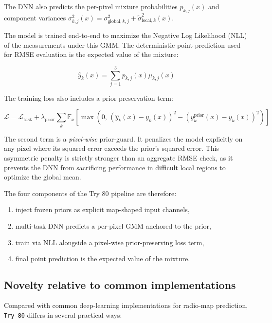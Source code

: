 \documentclass[11pt,a4paper]{article}
\begin{document}
The DNN also predicts the per-pixel mixture probabilities $p_{k,j}(x)$ and
component variances $\sigma_{k,j}^2(x) = \sigma_{\mathrm{global},k,j}^2 +
\tilde\sigma_{\mathrm{local},k}^2(x)$.

The model is trained end-to-end to maximize the Negative Log Likelihood (NLL)
of the measurements under this GMM. The deterministic point prediction used for
RMSE evaluation is the expected value of the mixture:

\begin{equation}
\hat y_k(x) = \sum_{j=1}^3 p_{k,j}(x) \mu_{k,j}(x)
\label{eq:try80_point}
\end{equation}

The training loss also includes a prior-preservation term:

\begin{equation}
\mathcal{L}
=
\mathcal{L}_{\mathrm{task}}
+ \lambda_{\mathrm{prior}}
\sum_{k}
\mathbb{E}_{x}\!\left[\max\left(0,\,
\left(\hat y_k(x) - y_k(x)\right)^2 - \left(y^{\mathrm{prior}}_k(x) - y_k(x)\right)^2
\right)\right]
\label{eq:try80_loss}
\end{equation}

The second term is a \emph{pixel-wise} prior-guard. It penalizes the model
explicitly on any pixel where its squared error exceeds the prior's squared
error. This asymmetric penalty is strictly stronger than an aggregate RMSE
check, as it prevents the DNN from sacrificing performance in difficult local
regions to optimize the global mean.

The four components of the Try 80 pipeline are therefore:

\begin{enumerate}
\item inject frozen priors as explicit map-shaped input channels,
\item multi-task DNN predicts a per-pixel GMM anchored to the prior,
\item train via NLL alongside a pixel-wise prior-preserving loss term,
\item final point prediction is the expected value of the mixture.
\end{enumerate}

\subsection{Novelty relative to common implementations}

Compared with common deep-learning implementations for radio-map prediction,
\texttt{Try 80} differs in several practical ways:
\end{document}
